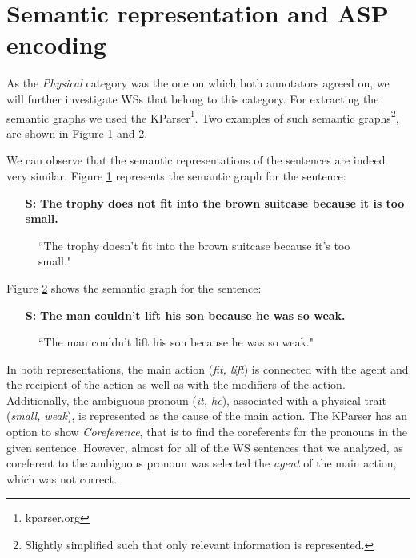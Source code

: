 \section{Semantic representation and ASP encoding}
As the \textit{Physical} category was the one on which both annotators agreed on, we will further investigate WSs that belong to this category. For extracting the semantic graphs we used the KParser\footnote{kparser.org}.
Two examples of such semantic graphs\footnote{Slightly simplified such that only relevant information is represented.}, are shown in Figure \ref{Graph1} and \ref{Graph2}. 

We can observe that the semantic representations of the sentences are indeed very similar. 
Figure \ref{Graph1} represents the semantic graph for the sentence:

\begin{itemize}
	\item[\textbf{S:}] \textbf{The trophy does not fit into the brown suitcase because it is too small.}
\end{itemize}
\begin{figure} [h!]
	\centering
	
	\caption{\label{Graph1}``The trophy doesn't fit into the brown suitcase because it's too small."}
\end{figure}


Figure \ref{Graph2} shows the semantic graph for the sentence:

\begin{itemize}
	\item[\textbf{S:}] \textbf{The man couldn't lift his son because he was so weak.}
\end{itemize} 


\begin{figure}[h!]
	\centering
	
	\caption{\label{Graph2}``The man couldn't lift his son because he was so weak."}
\end{figure}

In both representations, the main action (\textit{fit, lift}) is connected with the agent and the recipient of the action as well as with the modifiers of the action. Additionally, the ambiguous pronoun (\textit{it, he}),  associated with a physical trait (\textit{small, weak}), is represented as the cause of the main action. 
The KParser has an option to show \textit{Coreference}, that is to find the coreferents for the pronouns in the given sentence. However, almost for all of the WS sentences that we analyzed, as coreferent to the ambiguous pronoun was selected the \textit{agent} of the main action, which was not correct. 

